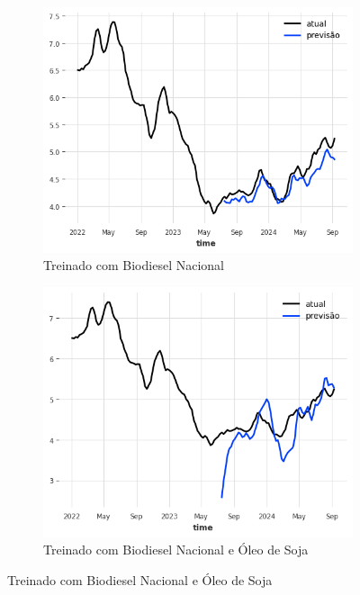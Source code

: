 \begin{figure}[htbp]
	\centering
	\begin{subfigure}[b]{0.45\textwidth}
		\centering
		\includegraphics[width=\textwidth]{figuras/idln_brasil_plot.png} %
		\caption{Treinado com Biodiesel Nacional \newline}
		\label{fig:idln_brasil_plot}
	\end{subfigure}
	\hfill
	\begin{subfigure}[b]{0.45\textwidth}
		\centering
		\includegraphics[width=\textwidth]{figuras/idln_brasil_oil_plot.png} %
		\caption{Treinado com Biodiesel Nacional e Óleo de Soja}
		\label{fig:idln_brasil_oil_plot}
	\end{subfigure}


\end{figure}
